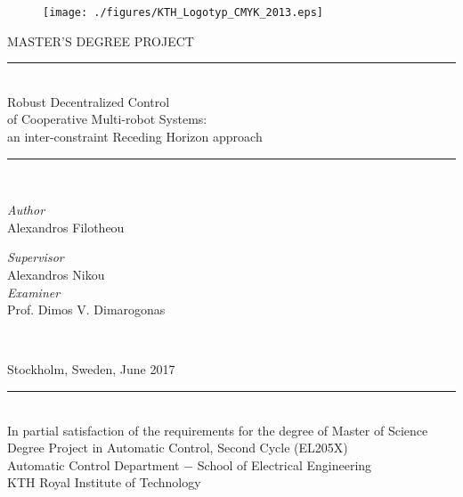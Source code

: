 \begin{titlepage}

\begin{figure}\centering
  \texttt{[image: ./figures/KTH\_Logotyp\_CMYK\_2013.eps]} \\[0.8cm]
\end{figure}



 \begin{center}
    \Large MASTER'S DEGREE PROJECT\\[0.8cm]

  \rule{350pt}{4pt} \\[0.3cm]
    \LARGE{Robust Decentralized Control \\
      of Cooperative Multi-robot Systems: \\
      an inter-constraint Receding Horizon approach} \\[0.3cm]
  \rule{350pt}{4pt} \\[2cm]

  \begin{minipage}{0.4\textwidth}
  \begin{flushleft} \large
  \emph{Author} \\
    Alexandros Filotheou
  \end{flushleft}
  \end{minipage}
  \begin{minipage}{0.4\textwidth}
  \begin{flushright} \large
  \emph{Supervisor} \\
    Alexandros Nikou \\
    \emph{Examiner} \\
    Prof. Dimos V. Dimarogonas
  \end{flushright}
\end{minipage}\\[2.5cm]
  \vfill

  \large Stockholm, Sweden, June 2017 \\
  \rule{250pt}{2pt} \\
  In partial satisfaction of the requirements for the degree of Master of Science \\
  Degree Project in Automatic Control, Second Cycle (EL205X) \\
  \large Automatic Control Department $-$ School of Electrical Engineering \\
  \large KTH Royal Institute of Technology

\end{center}
\end{titlepage}
